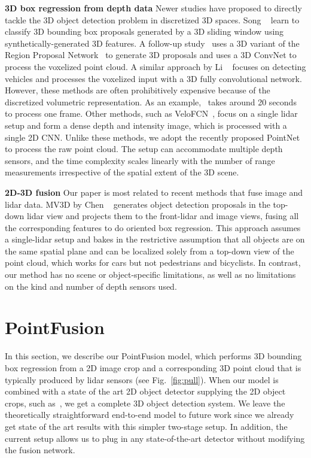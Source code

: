 \documentclass[10pt,twocolumn,letterpaper]{article}
\begin{document}
\textbf{3D box regression from depth data} Newer studies have proposed to directly tackle the 3D object detection problem in discretized 3D spaces. Song \etal~\cite{song2014sliding} learn to classify 3D bounding box proposals generated by a 3D sliding window using synthetically-generated 3D features. A follow-up study~\cite{song2016deep} uses a 3D variant of the Region Proposal Network~\cite{ren2015faster} to generate 3D proposals and uses a 3D ConvNet to process the voxelized point cloud. A similar approach by Li \etal~\cite{li20163d} focuses on detecting vehicles and processes the voxelized input with a 3D fully convolutional network. 
However, these methods are often prohibitively expensive because of the discretized volumetric representation. As an example,~\cite{song2016deep} takes around 20 seconds to process one frame. Other methods, such as VeloFCN~\cite{velofcn}, focus on a single lidar setup and form a dense depth and intensity image, which is processed with a single 2D CNN. Unlike these methods, we adopt the recently proposed PointNet~\cite{qi2016pointnet} to process the raw point cloud. The setup can accommodate multiple depth sensors, and the time complexity scales linearly with the number of range measurements irrespective of the spatial extent of the 3D scene.

\textbf{2D-3D fusion} Our paper is most related to 
recent methods that fuse image and lidar data.  MV3D by Chen \etal~\cite{mv3d} generates object detection proposals in the top-down lidar view and projects them to the front-lidar and image views, fusing all the corresponding features to do oriented box regression. This approach assumes a single-lidar setup and bakes in the restrictive assumption that all objects are on the same spatial plane and can be localized solely from a top-down view of the point cloud, which works for cars but not pedestrians and bicyclists. In contrast, our method has no scene or object-specific limitations, as well as no limitations on the kind and number of depth sensors used. 


\section{PointFusion}
\label{sec:model}

In this section, we describe our PointFusion model, which performs 3D bounding box regression from a 2D image crop and a corresponding 3D point cloud that is typically produced by lidar sensors (see Fig.~\ref{fig:pull}). When our model is combined with a state of the art 2D object detector supplying the 2D object crops, such as~\cite{ren2015faster}, we get a complete 3D object detection system. We leave the theoretically straightforward end-to-end model to future work since we already get state of the art results with this simpler two-stage setup. In addition, the current setup allows us to plug in any state-of-the-art detector without modifying the fusion network.
\end{document}
